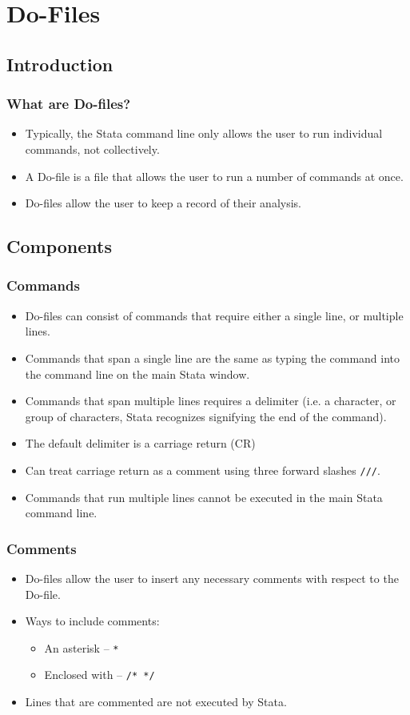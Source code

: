 \documentclass{beamer}
\begin{document}
\section{Do-Files}

\subsection{Introduction}

\begin{frame}
	\frametitle{What are Do-files?}
		\begin{itemize}
			\item Typically, the Stata command line only allows the user to run individual commands, not collectively.
			\item A Do-file is a file that allows the user to run a number of commands at once.
			\item Do-files allow the user to keep a record of their analysis.
		\end{itemize}
\end{frame}

\subsection{Components}

\begin{frame}
	\frametitle{Commands}
		\begin{itemize}
			\item Do-files can consist of commands that require either a single line, or multiple lines.
			\item Commands that span a single line are the same as typing the command into the command line on the main Stata window.
			\item Commands that span multiple lines requires a delimiter (i.e. a character, or group of characters, Stata recognizes signifying the end of the command).
			\item The default delimiter is a carriage return (CR)
			\item Can treat carriage return as a comment using three forward slashes \texttt{///}.
			\item Commands that run multiple lines cannot be executed in the main Stata command line.
		\end{itemize}
\end{frame}

\begin{frame}
	\frametitle{Comments}
		\begin{itemize}
			\item Do-files allow the user to insert any necessary comments with respect to the Do-file.
			\item Ways to include comments:
				\begin{itemize}
					\item An asterisk -- \texttt{*}
					\item Enclosed with -- \texttt{/* */}
				\end{itemize}
			\item Lines that are commented are not executed by Stata.
		\end{itemize}
\end{frame}
\end{document}
